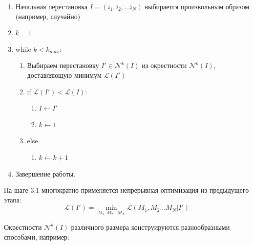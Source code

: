 \documentclass[14pt]{extarticle}
\theoremstyle{plain}%
\theoremstyle{definition}
\theoremstyle{remark}
\begin{document}
\begin{enumerate}[label*=\arabic*.]
  \item Начальная перестановка
  $I = (i_1, i_2, ... i_N)$
  выбирается произвольным образом
  (например, случайно)
  \item $k=1$
  \item while $k < k_{max}$:
  \begin{enumerate}
    [label*=\arabic*.]
    \item Выбираем перестановку $I' \in \mathcal N^k(I)$
    из окрестности
    $\mathcal N^k(I)$,
    доставляющую минимум
    $\mathcal L(I')$
    \item if $\mathcal L(I')< \mathcal L(I)$:
    \begin{enumerate}[label*=\arabic*.]
      \item $I \gets I'$
      \item $k \gets 1$
    \end{enumerate}
    \item else
    \begin{enumerate}[label*=\arabic*.]
      \item $k \gets k+1$
    \end{enumerate}
  \end{enumerate}
  \item Завершение работы.
\end{enumerate}

На шаге 3.1
многократно применяется
непрерывная оптимизация из предыдущего этапа:
$$
\mathcal L (I') = \min_{M_1, M_2 \dots M_N}
  \mathcal L (M_1, M_2 \dots M_N | I')
$$

Окрестности
$\mathcal N^k(I)$
различного размера
конструируются разнообразными способами,
например:
\end{document}
